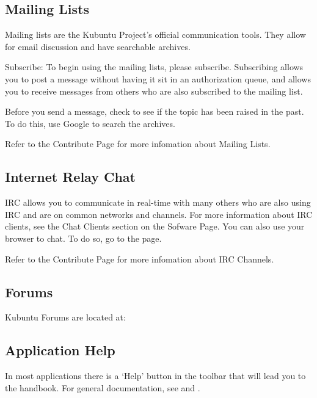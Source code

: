\documentclass[letterpaper,10pt,english]{sphinxmanual}
\begin{document}
\subsection{Mailing Lists}
\label{\detokenize{docs/support:mailing-lists}}
Mailing lists are the Kubuntu Project’s official communication tools. They allow for email discussion and have searchable archives.

Subscribe:
To begin using the mailing lists, please subscribe. Subscribing allows you to post a message without having it sit in an authorization queue, and allows you to receive messages from others who are also subscribed to the mailing list.

Before you send a message, check to see if the topic has been raised in the past. To do this, use Google to search the archives.

Refer to the Contribute Page for more infomation about Mailing Lists.


\subsection{Internet Relay Chat}
\label{\detokenize{docs/support:internet-relay-chat}}
IRC allows you to communicate in real-time with many others who are also using IRC and are on common networks and channels. For more information about IRC clients, see the Chat Clients section on the Sofware Page. You can also use your browser to chat. To do so, go to the  page.

Refer to the Contribute Page for more infomation about IRC Channels.


\subsection{Forums}
\label{\detokenize{docs/support:forums}}
Kubuntu Forums are located at: 


\subsection{Application Help}
\label{\detokenize{docs/support:application-help}}
In most  applications there is a ‘Help’ button in the toolbar that will lead you to the handbook. For general  documentation, see  and .
\end{document}
